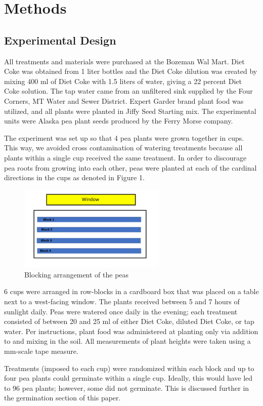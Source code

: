 \documentclass[1p,12pt]{elsarticle}\usepackage[]{graphicx}\usepackage[]{color}
\begin{document}
\section{Methods}
\subsection{Experimental Design}

All treatments and materials were purchased at the Bozeman Wal Mart. Diet Coke was obtained from 1 liter bottles and the Diet Coke dilution was created by mixing 400 ml of Diet Coke with 1.5 liters of water, giving a 22 percent Diet Coke solution. The tap water came from an unfiltered sink supplied by the Four Corners, MT Water and Sewer District. Expert Garder brand plant food was utilized, and all plants were planted in Jiffy Seed Starting mix.  The experimental units were Alaska pea plant seeds produced by the Ferry Morse company. 

The experiment was set up so that 4 pea plants were grown together in cups. This way, we avoided cross contamination of watering treatments because all plants within a single cup received the same treatment.  In order to discourage pea roots from growing into each other, peas were planted at each of the cardinal directions in the cups as denoted in Figure 1. 
 \begin{figure}[h!]
 	\caption{Blocking arrangement of the peas}
 	\centering
	\includegraphics[width = 7cm]{blocks.png}
\end{figure}


6 cups were arranged in row-blocks in a cardboard box that was placed on a table next to a west-facing window. The plants received between 5 and 7 hours of sunlight daily.  Peas were watered once daily in the evening; each treatment consisted of between 20 and 25 ml of either Diet Coke, diluted Diet Coke, or tap water. Per instructions, plant food was administered at planting only via addition to and mixing in the soil.  All measurements of plant heights were taken using a mm-scale tape measure. 

Treatments (imposed to each cup) were randomized within each block and up to four pea plants could germinate within a single cup. Ideally, this would have led to 96 pea plants; however, some did not germinate. This is discussed further in the germination section of this paper. 
\end{document}
